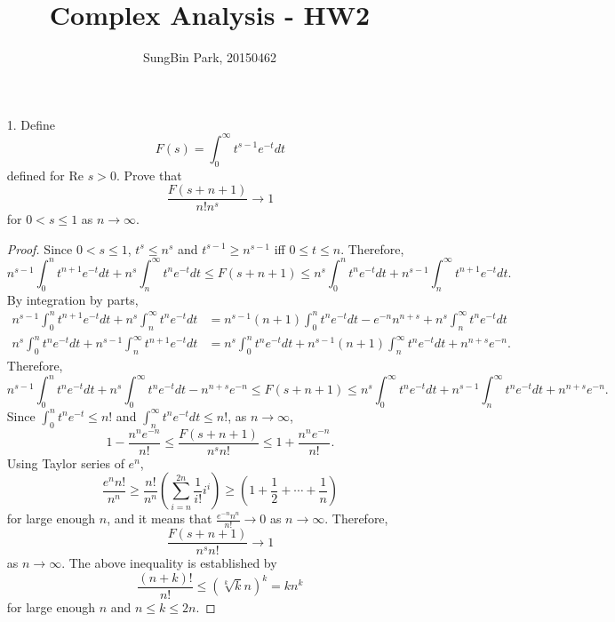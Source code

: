 \documentclass{article}
\begin{document}
\title{Complex Analysis - HW2}
\author{SungBin Park, 20150462} 

\maketitle
\begin{enumerate}
\item[1.] Define
\begin{equation*}
F(s)=\int_0^\infty t^{s-1}e^{-t} dt
\end{equation*}
defined for $\text{Re }s>0$. Prove that
\begin{equation*}
\frac{F(s+n+1)}{n!n^s}\rightarrow 1
\end{equation*}
for $0< s\leq 1$ as $n\rightarrow \infty$.
\begin{proof}
Since $0<s\leq 1$, $t^s\leq n^s$ and $t^{s-1}\geq n^{s-1}$ iff $0\leq t\leq n$. Therefore,
\begin{equation*}
n^{s-1}\int_0^n t^{n+1} e^{-t} dt+n^{s}\int_n^\infty t^n e^{-t}dt \leq F(s+n+1)\leq n^s\int_0^n t^n e^{-t} dt+n^{s-1}\int_n^\infty t^{n+1} e^{-t}dt .
\end{equation*}
By integration by parts,
\begin{equation*}
\begin{split}
n^{s-1}\int_0^n t^{n+1} e^{-t} dt+n^{s}\int_n^\infty t^n e^{-t}dt &= n^{s-1}(n+1)\int_0^n t^{n} e^{-t} dt-e^{-n} n^{n+s}+n^{s}\int_n^\infty t^n e^{-t}dt \\
n^s\int_0^n t^n e^{-t} dt+n^{s-1}\int_n^\infty t^{n+1} e^{-t}dt &= n^s\int_0^n t^n e^{-t} dt+n^{s-1}(n+1)\int_n^\infty t^{n} e^{-t}dt + n^{n+s}e^{-n}.
\end{split}
\end{equation*}
Therefore,
\begin{equation*}
n^{s-1}\int_0^n t^{n} e^{-t} dt+n^{s}\int_0^\infty t^n e^{-t}dt -n^{n+s}e^{-n}\leq F(s+n+1)\leq n^s\int_0^\infty t^n e^{-t} dt+n^{s-1}\int_n^\infty t^{n} e^{-t}dt+n^{n+s}e^{-n}.
\end{equation*}
Since $\int_0^n t^ne^{-t}\leq n!$ and $\int_n^\infty t^ne^{-t}dt\leq n!$, as $n\rightarrow \infty$,
\begin{equation*}
1-\frac{n^{n}e^{-n}}{n!}\leq \frac{F(s+n+1)}{n^sn!}\leq 1+\frac{n^{n}e^{-n}}{n!}.
\end{equation*}
Using Taylor series of $e^n$,
\begin{equation*}
\frac{e^n n!}{n^n}\geq \frac{n!}{n^n}\left(\sum\limits_{i=n}^{2n} \frac{1}{i!}i^i\right)\geq \left(1+\frac{1}{2}+\cdots+\frac{1}{n}\right)
\end{equation*}
for large enough $n$, and it means that $\frac{e^{-n}n^n}{n!}\rightarrow 0$ as $n\rightarrow \infty$. Therefore,
\begin{equation*}
\frac{F(s+n+1)}{n^sn!}\rightarrow 1
\end{equation*}
as $n\rightarrow \infty$. The above inequality is established by
\begin{equation*}
\frac{(n+k)!}{n!}\leq (\sqrt[k]{k}n)^k=kn^k
\end{equation*}
for large enough $n$ and $n\leq k\leq 2n$.
\end{proof}


\end{enumerate}
\end{document}

